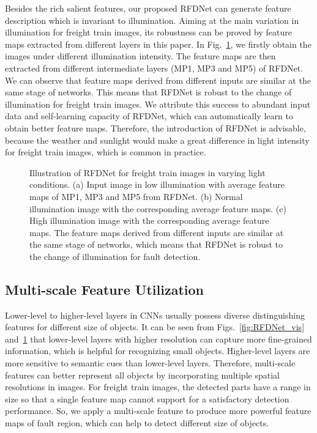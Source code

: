 Besides the rich salient features, our proposed RFDNet can generate feature description which is invariant to illumination. Aiming at the main variation in illumination for freight train images, its robustness can be proved by feature maps extracted from different layers in this paper. In Fig.~\ref{fig:conv}, we firstly obtain the images under different illumination intensity. The feature maps are then extracted from different intermediate layers (MP1, MP3 and MP5) of RFDNet. We can observe that feature maps derived from different inputs are similar at the same stage of networks. This means that RFDNet is robust to the change of illumination for freight train images. We attribute this success to abundant input data and self-learning capacity of RFDNet, which can automatically learn to obtain better feature maps. Therefore, the introduction of RFDNet is advisable, because the weather and sunlight would make a great difference in light intensity for freight train images, which is common in practice. %

\begin{figure}[!t]
 \centering
 \caption{Illustration of RFDNet for freight train images in varying light conditions. (a) Input image in low illumination with average feature maps of MP1, MP3 and MP5 from RFDNet. (b) Normal illumination image with the corresponding average feature maps. (c) High illumination image with the corresponding average feature maps. The feature maps derived from different inputs are similar at the same stage of networks, which means that RFDNet is robust to the change of illumination for fault detection.}
 \label{fig:conv}
\end{figure}

\subsection{Multi-scale Feature Utilization}
Lower-level to higher-level layers in CNNs usually possess diverse distinguishing features for different size of objects. It can be seen from Figs.~\ref{fig:RFDNet_vis} and~\ref{fig:conv} that lower-level layers with higher resolution can capture more fine-grained information, which is helpful for recognizing small objects. Higher-level layers are more sensitive to semantic cues than lower-level layers. Therefore, multi-scale features can better represent all objects by incorporating multiple spatial resolutions in images. For freight train images, the detected parts have a range in size so that a single feature map cannot support for a satisfactory detection performance. So, we apply a multi-scale feature to produce more powerful feature maps of fault region, which can help to detect different size of objects.

